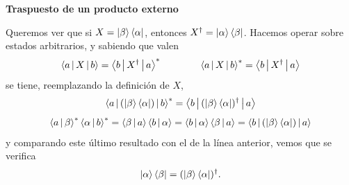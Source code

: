 \documentclass[10pt,oneside]{CBFT_book}
\begin{document}
\begin{ejemplo}{\bf Traspuesto de un producto externo}

Queremos ver que si $X = \Ket{\beta} \Bra{\alpha}$, entonces $X^\dagger = \Ket{\alpha} \Bra{\beta}$.
Hacemos operar sobre estados arbitrarios, y sabiendo que valen 
\[
	\Braket{a|X|b} = \Braket{b|X^\dagger|a}^* \qquad \qquad \Braket{a|X|b}^* = \Braket{b|X^\dagger|a}
\]
se tiene, reemplazando la definición de $X$,
\[
	 \Braket{a|(\Ket{\beta} \Bra{\alpha})|b}^* = \Braket{b|(\Ket{\beta} \Bra{\alpha})^\dagger|a}
\]
\[
	 \Braket{a|\beta}^* \Braket{\alpha|b}^* = \Braket{\beta|a} \Braket{b|\alpha} =
	 \Braket{b|\alpha}\Braket{\beta|a} = \Braket{b|(\Ket{\beta} \Bra{\alpha})|a}
\]
y comparando este último resultado con el de la línea anterior, vemos que se verifica
\[
	\Ket{\alpha} \Bra{\beta} = (\Ket{\beta} \Bra{\alpha})^\dagger.
\]
 
\end{ejemplo}
\end{document}
